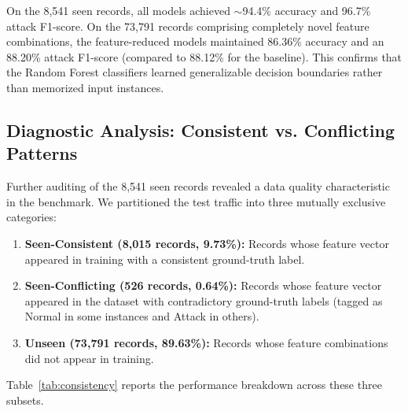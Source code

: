 \documentclass[conference]{IEEEtran}
\begin{document}
On the 8,541 seen records, all models achieved $\sim$94.4\% accuracy and 96.7\% attack F1-score. On the 73,791 records comprising completely novel feature combinations, the feature-reduced models maintained 86.36\% accuracy and an 88.20\% attack F1-score (compared to 88.12\% for the baseline). This confirms that the Random Forest classifiers learned generalizable decision boundaries rather than memorized input instances.

\subsection{Diagnostic Analysis: Consistent vs. Conflicting Patterns}
Further auditing of the 8,541 seen records revealed a data quality characteristic in the benchmark. We partitioned the test traffic into three mutually exclusive categories:
\begin{enumerate}
    \item \textbf{Seen-Consistent (8,015 records, 9.73\%):} Records whose feature vector appeared in training with a consistent ground-truth label.
    \item \textbf{Seen-Conflicting (526 records, 0.64\%):} Records whose feature vector appeared in the dataset with contradictory ground-truth labels (tagged as Normal in some instances and Attack in others).
    \item \textbf{Unseen (73,791 records, 89.63\%):} Records whose feature combinations did not appear in training.
\end{enumerate}

Table~\ref{tab:consistency} reports the performance breakdown across these three subsets.
\end{document}
